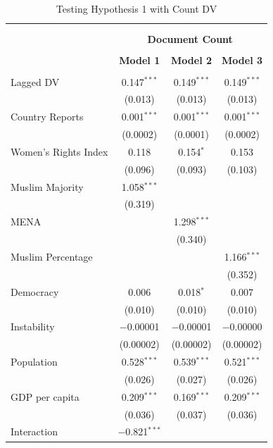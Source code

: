 \documentclass[11pt, oneside]{article}
\begin{document}
\begin{table}[!htbp] \centering 
  \caption{Testing Hypothesis 1 with Count DV}
    \label{table:negbin} 
\begin{tabular}{@{\extracolsep{5pt}}lccc} 
\\[-1.8ex]\hline \\[-1.8ex] 
\\[-1.8ex] & \multicolumn{3}{c}{\textbf{Document Count}} \\ 
\\[-1.8ex] & \textbf{Model 1} & \textbf{Model 2} & \textbf{Model 3}\\ 
\hline \\[-1.8ex] 
 Lagged DV & 0.147$^{***}$ & 0.149$^{***}$ & 0.149$^{***}$ \\ 
  & (0.013) & (0.013) & (0.013) \\ 
  Country Reports & 0.001$^{***}$ & 0.001$^{***}$ & 0.001$^{***}$ \\ 
  & (0.0002) & (0.0001) & (0.0002) \\ 
  Women's Rights Index & 0.118 & 0.154$^{*}$ & 0.153 \\ 
  & (0.096) & (0.093) & (0.103) \\ 
  Muslim Majority & 1.058$^{***}$ &  &  \\ 
  & (0.319) &  &  \\ 
  MENA &  & 1.298$^{***}$ &  \\ 
  &  & (0.340) &  \\ 
  Muslim Percentage &  &  & 1.166$^{***}$ \\ 
  &  &  & (0.352) \\ 
  Democracy & 0.006 & 0.018$^{*}$ & 0.007 \\ 
  & (0.010) & (0.010) & (0.010) \\ 
  Instability & $-$0.00001 & $-$0.00001 & $-$0.00000 \\ 
  & (0.00002) & (0.00002) & (0.00002) \\ 
  Population & 0.528$^{***}$ & 0.539$^{***}$ & 0.521$^{***}$ \\ 
  & (0.026) & (0.027) & (0.026) \\ 
  GDP per capita & 0.209$^{***}$ & 0.169$^{***}$ & 0.209$^{***}$ \\ 
  & (0.036) & (0.037) & (0.036) \\ 
  Interaction & $-$0.821$^{***}$ &  &  \\ 

\end{tabular}
\end{table}
\end{document}
